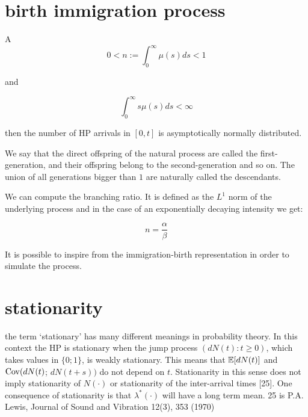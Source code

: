 \documentclass[11pt]{book}
\begin{document}
\frontmatter
\pagestyle{front}

\mainmatter
\pagestyle{main}





























\section{birth immigration process}

\begin{theoreme}{A}
$$0 < n   := \int_0^{\infty} \mu (s) ds < 1  $$ 

and 

$$\int_0^{\infty} s \mu(s) ds < \infty $$

then the number of HP arrivals in $[0,t]$ is asymptotically normally distributed.
\end{theoreme}

We say that the direct offspring of the natural process are called the first-generation, and their offspring belong to the second-generation and so on. The union of all generations bigger than $1$ are naturally called the descendants.

We can compute the branching ratio. It is defined as the $L^1$ norm of the underlying process and in the case of an exponentially decaying intensity we get:

$$ n = \frac{\alpha}{\beta} $$

It is possible to inspire from the immigration-birth representation in order to simulate the process.



\section{stationarity}

the term `stationary' has many different meanings in probability theory. In this context the HP is stationary when the jump process $(dN(t) : t \geq 0)$, which takes values in $\{0; 1\}$, is
weakly stationary. This means that $\mathbb E[dN(t)]$ and $\mathrm{Cov}(dN(t)$; $dN(t+s))$ do not depend on $t$. Stationarity
in this sense does not imply stationarity of $N(\cdot)$ or stationarity of the inter-arrival times [25]. One
consequence of stationarity is that $\lambda^* ( \cdot )$ will have a long term mean.
25 is P.A. Lewis, Journal of Sound and Vibration 12(3), 353 (1970)
\end{document}
